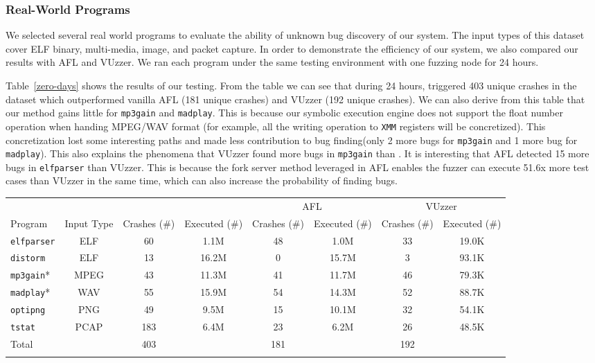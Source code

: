 \subsubsection{Real-World Programs}
We selected several real world programs to evaluate the ability of unknown bug 
discovery of our system. The input types of this dataset cover ELF binary, 
multi-media, image, and packet capture. In order to demonstrate the efficiency 
of our system, we also compared our results with AFL and VUzzer. We ran each
 program under the same testing environment with one fuzzing node for 24 hours. 

Table~\ref{zero-days} shows the results of our testing. 
From the table we can see that during 24 hours, \prototype triggered 403 
unique crashes in the dataset which outperformed vanilla AFL (181 unique crashes) 
and VUzzer (192 unique crashes). 
We can also derive from this table that our method gains little for \texttt{mp3gain} 
and \texttt{madplay}. This is because our symbolic execution engine does not support 
the float number operation when handing MPEG/WAV format (for example, all the 
writing operation to \texttt{XMM} registers will be concretized). This concretization 
lost some interesting paths and made less contribution to bug finding(only 2 more 
bugs for \texttt{mp3gain} and 1 more bug for \texttt{madplay}). 
This also explains the phenomena that VUzzer found more bugs in \texttt{mp3gain} 
than \prototype. 
It is interesting that AFL detected 15 more bugs in \texttt{elfparser} than VUzzer. 
This is because the fork server method leveraged in AFL enables the fuzzer can 
execute 51.6x more test cases than VUzzer in the same time, which can also increase 
the probability of finding bugs.

\begin{table}[!t]
{\begin{tabular}{lccccccc}\toprule
	& & \multicolumn{2}{c}{\prototype} & \multicolumn{2}{c}{AFL} & \multicolumn{2}{c}{VUzzer}\\
		    Program & Input Type & Crashes (\#) & Executed (\#)& 
		    Crashes (\#) & Executed  (\#) & Crashes (\#) & Executed (\#) \\
\midrule
\texttt{elfparser}  & ELF	& 60 &   1.1M & 48   & 1.0M   & 33 & 19.0K    \\
		\texttt{distorm}    & ELF    & 13 &   16.2M   & 0   & 15.7M    & 3 & 93.1K    \\
		\texttt{mp3gain}*   & MPEG	& 43 &   11.3M  & 41  &  11.7M   & 46 &  79.3K  \\
		\texttt{madplay}*   & WAV	& 55 &   15.9M  & 54  & 14.3M    & 52 & 88.7K   \\
		\texttt{optipng}    & PNG    & 49 &   9.5M & 15  &  10.1M   & 32 & 54.1K   \\
		\texttt{tstat}      & PCAP   & 183&   6.4M & 23 &  6.2M   & 26 & 48.5K   \\
		\midrule
		Total      &        & 403   &  & 181 &  & 192 &\\
\botrule
\end{tabular}}{}
\end{table}

